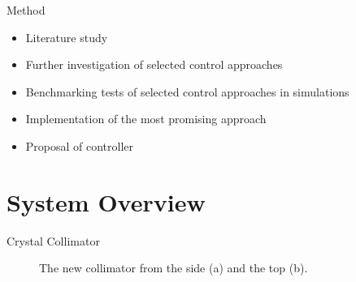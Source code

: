 \documentclass[10pt]{beamer}
\begin{document}
\begin{frame}[fragile]{Method}
  \begin{itemize}
    \item Literature study
    \item Further investigation of selected control approaches
    \item Benchmarking tests of selected control approaches in simulations
    \item Implementation of the most promising approach
    \item Proposal of controller
  \end{itemize}
\end{frame}

\section{System Overview}

\begin{frame}[fragile]{Crystal Collimator}
  \begin{figure}[h]
    \centering %
    \qquad
    \caption{\label{fig:collimator} The new collimator from the side (a) and the top (b).}
  \end{figure}
\end{frame}
\end{document}
